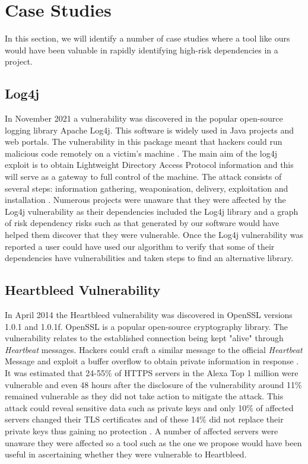 \documentclass[conference]{IEEEtran}
\begin{document}
\section{Case Studies}
In this section, we will identify a number of case studies where a tool like ours would have been valuable in rapidly identifying high-risk dependencies in a project. 

\subsection{Log4j}
In November 2021 a vulnerability was discovered in the popular open-source logging library Apache Log4j. This software is widely used in Java projects and web portals. The vulnerability in this package meant that hackers could run malicious code remotely on a victim's machine \cite{h_gupta_identification_2022}. The main aim of the log4j exploit is to obtain Lightweight Directory Access Protocol information and this will serve as a gateway to full control of the machine. The attack consists of several steps: information gathering, weaponisation, delivery, exploitation and installation \cite{f_maulana_unmasking_2023}. Numerous projects were unaware that they were affected by the Log4j vulnerability as their dependencies included the Log4j library and a graph of risk dependency risks such as that generated by our software would have helped them discover that they were vulnerable. Once the Log4j vulnerability was reported a user could have used our algorithm to verify that some of their dependencies have vulnerabilities and taken steps to find an alternative library. 

\subsection{Heartbleed Vulnerability}
In April 2014 the Heartbleed vulnerability was discovered in OpenSSL versions 1.0.1 and 1.0.1f. OpenSSL is a popular open-source cryptography library. The vulnerability relates to the established connection being kept "alive" through \textit{Heartbeat} messages. Hackers could craft a similar message to the official \textit{Heartbeat} Message and exploit a buffer overflow to obtain private information in response \cite{s_kyatam_heartbleed_2017}. It was estimated that 24-55\% of HTTPS servers in the Alexa Top 1 million were vulnerable and even 48 hours after the disclosure of the vulnerability around 11\% remained vulnerable as they did not take action to mitigate the attack. This attack could reveal sensitive data such as private keys and only 10\% of affected servers changed their TLS certificates and of these 14\% did not replace their private keys thus gaining no protection \cite{durumeric_matter_2014}. A number of affected servers were unaware they were affected so a tool such as the one we propose would have been useful in ascertaining whether they were vulnerable to Heartbleed. 
\end{document}
